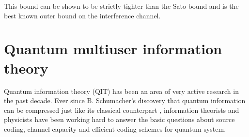 \documentclass[aps,11pt,twoside,letterpaper]{article}
\begin{document}
        This bound can be shown to be strictly tighter than the Sato bound and is the best known outer bound
        on the interference channel.
        
        
        




\section{Quantum multiuser information theory}      \label{section:quantum}

	Quantum information theory (QIT) has been an area of very active research in the past decade.
	Ever since B. Schumacher's discovery that quantum information can be compressed 
	just like its classical counterpart \cite{Sc95},
	information theorists and physicists have been working hard to answer the basic questions
	about source coding, channel capacity and efficient coding schemes for quantum system.
	
\end{document}
